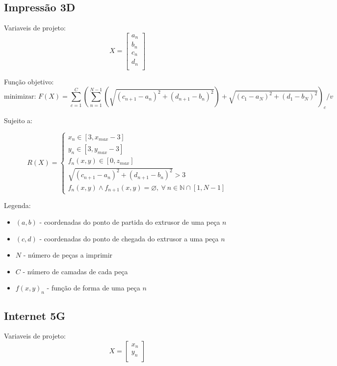 \documentclass[11pt,a4paper]{article}
\begin{document}
\subsection{Impressão 3D}

Variaveis de projeto:
$$ X = 
\begin{bmatrix}
    a_n \\
    b_n \\
    c_n \\
    d_n \\
\end{bmatrix}
$$

Função objetivo: 
$$
\text{minimizar: }  
F(X) =
\displaystyle\sum_{c=1}^{C}
\left( 
\displaystyle\sum_{n=1}^{N-1} 
\left( 
\sqrt{ \left( c_{n+1} - a_n \right)^2 + \left( d_{n+1} - b_n \right)^2} \right)
 + \sqrt{ \left( c_1 - a_N \right)^2 + \left( d_1 - b_N \right)^2}
\right)_c / v
$$

Sujeito a:

$$
R(X) = \left
\{ \begin{matrix} 
x_n \in [3, x_{max}-3] \\
y_n \in [3, y_{max}-3] \\
f_n(x,y) \in [0, z_{max}] \\
\sqrt{ \left( c_{n+1} - a_n \right)^2 + \left( d_{n+1} - b_n \right)^2} > 3 \\
f_n(x,y) \land f_{n+1}(x,y) = \varnothing,\ \forall\ n \in \mathbb{N} \cap [1,N-1]
\end{matrix} 
\right.
$$

Legenda:
\begin{itemize}
\item $(a,b)$ - coordenadas do ponto de partida do extrusor de uma peça $n$
\item $(c,d)$ - coordenadas do ponto de chegada do extrusor a uma peça $n$
\item $N$ - número de peças a imprimir
\item $C$ - número de camadas de cada peça
\item $f(x,y)_n$ - função de forma de uma peça $n$
\end{itemize}

\subsection{Internet 5G}

Variaveis de projeto:
$$ X = 
\begin{bmatrix}
    x_n \\
    y_n \\
\end{bmatrix}
$$
\end{document}
